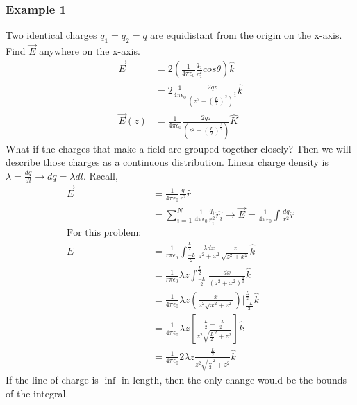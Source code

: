   \subsubsection{Example 1}
  Two identical charges $q_1=q_2=q$ are equidistant from the origin on the x-axis. Find $\vec{E}$ anywhere on the x-axis.
  \begin{align*}
    \vec{E}&=2\left(\frac{1}{4\pi\epsilon_0}\frac{q_2}{r_2^2}cos\theta\right)\hat{k}\\
    &=2\frac{1}{4\pi\epsilon_0}\frac{2qz}{\left(z^2+\left(\frac{L}{2}\right)^2\right)^{\frac{3}{2}}}\hat{k}\\
    \vec{E}(z)&=\frac{1}{4\pi\epsilon_0}\frac{2qz}{\left(z^2+\left(\frac{L}{2}\right)^{\frac{3}{2}}\right)}\hat{K}
  \end{align*}
  What if the charges that make a field are grouped together closely? Then we will describe those charges as a continuous distribution. Linear charge density is $\lambda=\frac{dq}{dl}\to dq=\lambda dl$. Recall,
  \begin{align*}
    \vec{E}&=\frac{1}{4\pi\epsilon_0}\frac{q}{r^2}\hat{r}\\
    &=\sum_{i=1}^N\frac{1}{4\pi\epsilon_0}\frac{q_i}{r_i^2}\hat{r_i}\to \vec{E}=\frac{1}{4\pi\epsilon_0}\int\frac{dq}{r^2}\hat{r}\\
    \text{For this problem: }\\
    E&=\frac{1}{r\pi\epsilon_0}\int_{\frac{-L}{2}}^{\frac{L}{2}}\frac{\lambda dx}{z^2+x^2}\frac{z}{\sqrt{z^2+x^2}}\hat{k}\\
    &=\frac{1}{r\pi\epsilon_0}\lambda z \int_{\frac{-L}{2}}^{\frac{L}{2}}\frac{dx}{(z^2+x^2)^{\frac{3}{2}}}\hat{k}\\
    &=\frac{1}{4\pi\epsilon_0}\lambda z \left(\frac{x}{z^2\sqrt{x^2+z^2}}\right)\Big|_{\frac{-L}{2}}^{\frac{L}{2}}\hat{k}\\
    &=\frac{1}{4\pi\epsilon_0}\lambda z \left[\frac{\frac{L}{2}-\frac{-L}{2}}{z^2\sqrt{\frac{L}{2}^2+z^2}}\right]\hat{k}\\
    &=\frac{1}{4\pi\epsilon_0}2\lambda z\frac{\frac{L}{2}}{z^2\sqrt{\frac{L}{2}^2+z^2}}\hat{k}
  \end{align*}
  If the line of charge is $\inf$ in length, then the only change would be the bounds of the integral.
